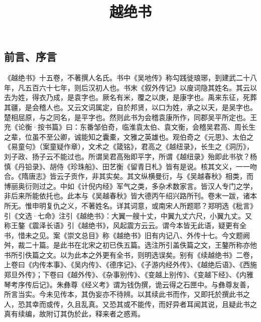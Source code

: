 \documentclass[12pt,UTF8]{ctexbook}
\title{\heiti\zihao{0} 越绝书}
\author{}
\date{}
\begin{document}
\maketitle
\tableofcontents

\frontmatter
\chapter{前言、序言}
《越绝书》十五卷，不著撰人名氏。书中《吴地传》称勾践徙琅琊，到建武二十八年，凡五百六十七年，则后汉初人也。书末《叙外传记》以廋词隐其姓名。其云以去为姓，得衣乃成，是袁字也。厥名有米，覆之以庚，是康字也。禹来东征，死葬其疆，是会稽人也。又云文词属定，自於邦贤，以口为姓，承之以天，是吴字也。楚相屈原，与之同名，是平字也。然则此书为会稽袁康所作，同郡吴平所定也。王充《论衡·按书篇》曰：东番邹伯奇，临淮袁太伯、袁文衡，会稽吴君高、周长生之辈，位虽不至公卿，诚能知之囊橐，文雅之英雄也。观伯奇之《元思》、太伯之《易童句》（案童疑作章），文术之《箴铭》，君高之《越纽录》，长生之《洞历》，刘子政、扬子云不能过也。所谓吴君高殆即平字，所谓《越纽录》殆即此书欤？杨慎《丹铅录》、胡侍《珍珠船》、田艺衡《留青日札》皆有是说。核其文义，一一吻合。《隋唐志》皆云子贡作，非其实矣。其文纵横曼衍，与《吴越春秋》相类，而博丽奥衍则过之。中如《计倪内经》军气之类，多杂术数家言。皆汉人专门之学，非后来所能依托也。此本与《吴越春秋》皆大德丙午绍兴路所刊。卷末一跋，诸本所无。惟申明复仇之义，不著姓名。详其词意，或南宋人所题耶？郑明选《秕言》引《文选·七命》注引《越绝书》：大翼一艘十丈，中翼九丈六尺，小翼九丈。又称王鏊《震泽长语》引《越绝书》，风起震方云云。谓今本皆无此语，疑更有全书，惜未之见。案《崇文总目》称《越绝书》旧有内记八、外传十七。今文题阙舛，裁二十篇。是此书在北宋之初已佚五篇。选注所引盖佚篇之文，王鏊所称亦他书所引佚篇之文。以为此本之外更有全书，则明选误矣。别有《续越绝书》二卷，上卷曰《内传本事》、《吴内传》、《德序记》、《子游内经外传》、《越绝后语》、《西施郑旦外传》；下卷曰《越外传》、《杂事别传》、《变越上别传》、《变越下经》、《内雅琴考序传后记》。朱彝尊《经义考》谓为钱伪撰，诡云得之石匣中。与彝尊友善，所言当实。今未见传本，其伪妄亦不待辨。以其续此书而作，又即托於撰此书之人，恐其幸而或传，久且乱真。又恐其或不能传，而好异者耳闻其说，且疑此书之真有续编，故附订其伪於此，释来者之惑焉。

\mainmatter

~\\

 \qquad  

\part{}
\end{document}
